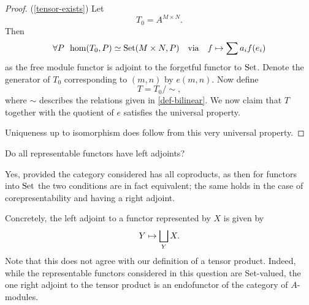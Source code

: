 \begin{proof}(\cref{tensor-exists})
  Let
  \[ T_0 = A^{M \times N}.\]
  Then
  \[ \forall P \enspace \hom(T_0, P) \simeq \text{Set}(M \times N, P) \quad \text{via} \quad  f \mapsto \sum a_i f(e_i)\]
  as the free module functor is adjoint to the forgetful functor to $\text{Set}$.
  Denote the generator of $T_0$ corresponding to $(m, n)$ by $e(m, n)$. Now define
  \[ T = T_0 / {\sim}, \]
  where $\sim$ describes the relations given in \cref{def-bilinear}.
  We now claim that $T$ together with the quotient of $e$ satisfies the universal property.

  Uniqueness up to isomorphism does follow from this very universal property.
\end{proof}

\begin{question}
  Do all representable functors have left adjoints?
\end{question}
\begin{answer}
  Yes, provided the category considered has all coproducts, as then for functors into $\text{Set}$ the two conditions are in fact equivalent; the same holds in the case of corepresentability and having a right adjoint.

  Concretely, the left adjoint to a functor represented by $X$ is given by
  \[ Y \mapsto \bigsqcup_Y X.\]
  Note that this does not agree with our definition of a tensor product. Indeed, while the representable functors considered in this question are Set-valued, the one right adjoint to the tensor product is an endofunctor of the category of $A$-modules.
\end{answer}



